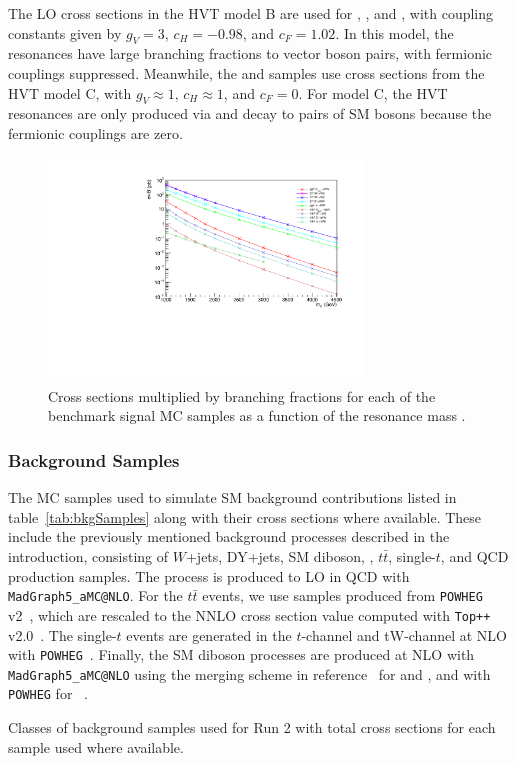 The LO cross sections in the HVT model B are used for \DY\ZprtoWW, \DY\WprtoWZ, and \DY\WprtoWH, with coupling constants given by $g_V=3$, $c_H=-0.98$, and $c_F=1.02$.
In this model, the resonances have large branching fractions to vector boson pairs, with fermionic couplings suppressed.
Meanwhile, the \VBF\ZprtoWW and \DY\WprtoWZ samples use cross sections from the HVT model C, with $g_V\approx1$, $c_H\approx1$, and $c_F=0$.
For model C, the HVT resonances are only produced via \VBF and decay to pairs of SM bosons because the fermionic couplings are zero.

\begin{figure}[htbp]
  \centering
  \includegraphics[width=0.75\textwidth]{fig/samples/sigCrossSec.pdf}
  \caption{
    Cross sections multiplied by branching fractions for each of the benchmark signal MC samples as a function of the resonance mass \MX.
  }
  \label{fig:sigCrossSec}
\end{figure}

\subsubsection{Background Samples}

The MC samples used to simulate SM background contributions listed in table~\ref{tab:bkgSamples} along with their cross sections where available.
These include the previously mentioned background processes described in the introduction, consisting of $W$+jets, DY+jets, SM diboson, \bbbar, $t\bar{t}$, single-$t$, and QCD production samples.
The \Wjets process is produced to LO in QCD with \texttt{MadGraph5\_aMC@NLO}.
For the $t\bar{t}$ events, we use samples produced from \texttt{POWHEG} v2~\cite{Nason_2004,Frixione_2007,Alioli_2010,Alioli_2012}, which are rescaled to the NNLO cross section value computed with \texttt{Top++} v2.0~\cite{Czakon_2014}.
The single-$t$ events are generated in the $t$-channel and tW-channel at NLO with \texttt{POWHEG}~\cite{Alioli_2009,Re_2011}.
Finally, the SM diboson processes are produced at NLO with \texttt{MadGraph5\_aMC@NLO} using the merging scheme in reference~\cite{Frederix_2012} for \WZ and \ZZ, and with \texttt{POWHEG} for \WW~\cite{Nason_2014}.

\begin{table}
  \centering
  
  \caption{
    Classes of background samples used for Run 2 with total cross sections for each sample used where available.
  }
  \label{tab:bkgSamples}
\end{table}
